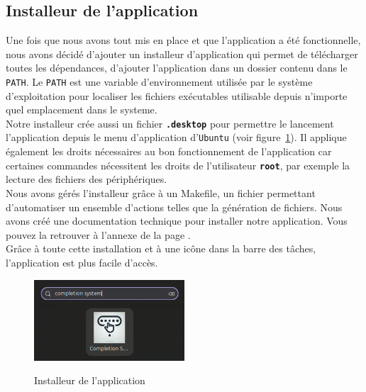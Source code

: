 \documentclass[a4paper, 11pt]{report}
\newcommand{\var}[1]{\texttt{\textbf{#1}}}
\newcommand{\langage}[1]{\texttt{#1}}
\begin{document}
{\subsection{Installeur de l'application}

Une fois que nous avons tout mis en place et que l'application a été fonctionnelle, nous avons décidé d'ajouter un installeur d'application qui permet de télécharger toutes les dépendances, d'ajouter l'application dans un dossier contenu dans le \langage{PATH}. Le \langage{PATH} est une variable d'environnement utilisée par le système d'exploitation pour localiser les fichiers exécutables utilisable depuis n'importe quel emplacement dans le systeme.\\

Notre installeur crée aussi un fichier \var{.desktop} pour permettre le lancement l'application depuis le menu d'application d'\langage{Ubuntu} (voir figure~\ref{fig:lanceur}). Il applique également les droits nécessaires au bon fonctionnement de l'application car certaines commandes nécessitent les droits de l'utilisateur \var{root}, par exemple la lecture des fichiers des périphériques. \\

Nous avons gérés l'installeur grâce à un Makefile, un fichier permettant d'automatiser un ensemble d'actions telles que la génération de fichiers. Nous avons créé une documentation technique pour installer notre application. Vous pouvez la retrouver à l'annexe de la page \underline{\pageref{annexe}}.\\

Grâce à toute cette installation et à une icône dans la barre des tâches, l'application est plus facile d'accès.

\begin{figure}[H]
	\begin{center}
		{\includegraphics[width=0.5\textwidth]{images/application.png}}
	\end{center}
	\caption{Installeur de l'application}
	\label{fig:lanceur}
\end{figure}

}
\end{document}
